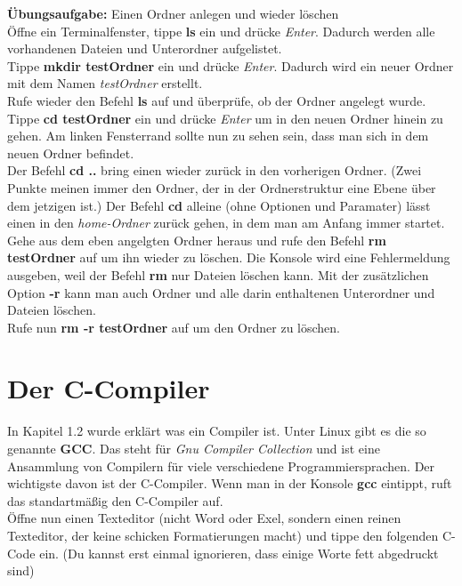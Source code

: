 \documentclass[c_worksheet.tex]{subfiles}
\begin{document}
\textbf{Übungsaufgabe:} Einen Ordner anlegen und wieder löschen\\
Öffne ein Terminalfenster, tippe \textbf{ls} ein und drücke \textit{Enter}. Dadurch werden alle vorhandenen Dateien und Unterordner aufgelistet.\\
Tippe \textbf{mkdir testOrdner} ein und drücke \textit{Enter}. Dadurch wird ein neuer Ordner mit dem Namen \textit{testOrdner} erstellt.\\
Rufe wieder den Befehl \textbf{ls} auf und überprüfe, ob der Ordner angelegt wurde.\\
Tippe \textbf{cd testOrdner} ein und drücke \textit{Enter} um in den neuen Ordner hinein zu gehen. Am linken Fensterrand sollte nun zu sehen sein, dass man sich in dem neuen Ordner befindet.\\
Der Befehl \textbf{cd ..} bring einen wieder zurück in den vorherigen Ordner. (Zwei Punkte meinen immer den Ordner, der in der Ordnerstruktur eine Ebene über dem jetzigen ist.) Der Befehl \textbf{cd} alleine (ohne Optionen und Paramater) lässt einen in den \textit{home-Ordner} zurück gehen, in dem man am Anfang immer startet.\\
Gehe aus dem eben angelgten Ordner heraus und rufe den Befehl \textbf{rm testOrdner} auf um ihn wieder zu löschen. Die Konsole wird eine Fehlermeldung ausgeben, weil der Befehl \textbf{rm} nur Dateien löschen kann. Mit der zusätzlichen Option \textbf{-r} kann man auch Ordner und alle darin enthaltenen Unterordner und Dateien löschen.\\
Rufe nun \textbf{rm -r testOrdner} auf um den Ordner zu löschen.

\newpage
\section{Der C-Compiler}

In Kapitel 1.2 wurde erklärt was ein Compiler ist. Unter Linux gibt es die so genannte \textbf{GCC}. Das steht für \textit{Gnu Compiler Collection} und ist eine Ansammlung von Compilern für viele verschiedene Programmiersprachen. Der wichtigste davon ist der C-Compiler. Wenn man in der Konsole \textbf{gcc} eintippt, ruft das standartmäßig den C-Compiler auf.\\

Öffne nun einen Texteditor (nicht Word oder Exel, sondern einen reinen Texteditor, der keine schicken Formatierungen macht) und tippe den folgenden C-Code ein. (Du kannst erst einmal ignorieren, dass einige Worte fett abgedruckt sind)\\
\end{document}
